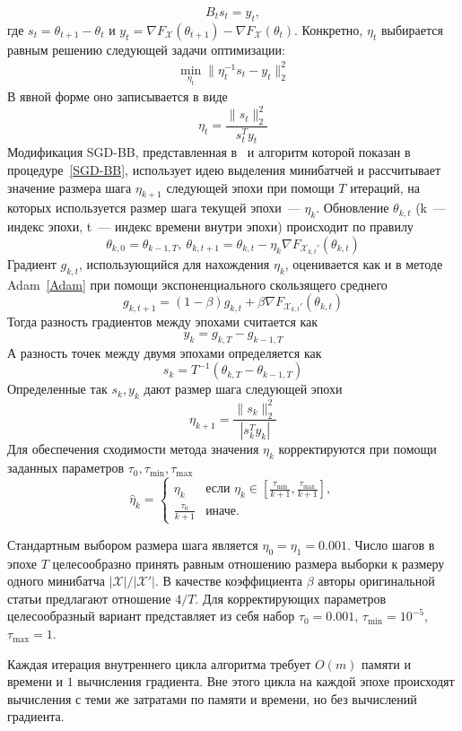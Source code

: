\documentclass[preprint,12pt]{elsarticle}
\begin{document}
\[
    B_ts_t = y_t,
\]
где $s_t = \theta_{t+1} - \theta_t$ и $y_t = \nabla F_\mathcal{X}(\theta_{t+1}) - \nabla F_\mathcal{X}(\theta_t)$.
Конкретно, $\eta_t$ выбирается равным решению следующей задачи оптимизации:
\begin{align*}
    \min_{\eta_{t}}\| \eta_t^{-1}s_{t}-y_{t}\|_2^2
\end{align*}
В явной форме оно записывается в виде
$$\eta_{t} = \frac{\|s_{t}\|_2^2}{s_{t}^Ty_{t}}$$
Модификация SGD-BB, представленная в~\cite{BB-DL} и алгоритм которой показан в процедуре~\ref{SGD-BB}, использует идею выделения минибатчей и рассчитывает значение размера шага ${\eta}_{k+1}$ следующей эпохи при помощи $T$ итераций, на которых используется размер шага текущей эпохи~--- ${\eta}_{k}$. 
Обновление $\theta_{k, t}$ (k~--- индекс эпохи, t~--- индекс времени внутри эпохи) происходит по правилу
$$\theta_{k, 0} = \theta_{k-1, T},~\theta_{k, t+1} = \theta_{k, t} - {\eta}_k \nabla F_{\mathcal{X}_{k, t}'}(\theta_{k, t})$$
Градиент $g_{k, t}$, использующийся для нахождения ${\eta_k}$, оценивается как и в методе Adam~\ref{Adam} при помощи экспоненциального скользящего среднего
$$g_{k, t+1} = (1 - \beta) g_{k, t} + \beta \nabla F_{\mathcal{X}_{k, t}'}(\theta_{k, t})$$
Тогда разность градиентов между эпохами считается как
$$y_k = g_{k, T} - g_{k-1, T}$$
А разность точек между двумя эпохами определяется как
$$s_k = T^{-1}(\theta_{k, T} - \theta_{k-1, T})$$
Определенные так $s_k, y_k$ дают размер шага следующей эпохи
$$\eta_{k+1} = \frac{\|s_k\|_2^2}{|s_k^Ty_k|}$$
Для обеспечения сходимости метода значения $\eta_k$ корректируются при помощи заданных параметров $\tau_0, \tau_{\text{min}}, \tau_{\text{max}}$
$$\hat{\eta}_k = \begin{cases}
        \eta_k & \text{если } \eta_k \in \left[\frac{\tau_{\text{min}}}{k+1}, \frac {\tau_{\text{max}}}{k+1}\right], \\
        \frac{\tau_0}{k+1} & \text{иначе.}
    \end{cases}$$

Стандартным выбором размера шага является $\eta_0 = \eta_1 = 0.001$. 
Число шагов в эпохе $T$ целесообразно принять равным отношению размера выборки к размеру одного минибатча $|\mathcal{X}|/|\mathcal{X}'|$. 
В качестве коэффициента $\beta$ авторы оригинальной статьи предлагают отношение $4 / T$. 
Для корректирующих параметров целесообразный вариант представляет из себя набор $\tau_0 = 0.001$, $\tau_\text{min} = 10^{-5}$, $\tau_\text{max} = 1$.

Каждая итерация внутреннего цикла алгоритма требует $O(m)$ памяти и времени и $1$ вычисления градиента. 
Вне этого цикла на каждой эпохе происходят вычисления с теми же затратами по памяти и времени, но без вычислений градиента.
\end{document}
